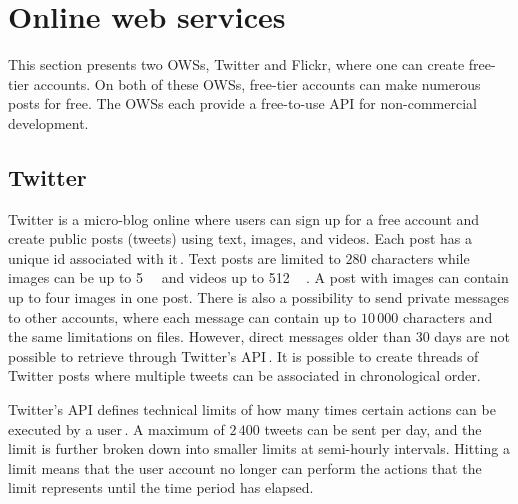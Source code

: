 \section{Online web services}
\label{sec:ows}
This section presents two \gls{OWS}s, Twitter and Flickr, where one can create \mbox{free-tier} accounts. On both of these \gls{OWS}s, \mbox{free-tier} accounts can make numerous posts for free. The \gls{OWS}s each provide a \mbox{free-to-use} \gls{API} for \mbox{non-commercial} development. 

\subsection{Twitter}
\label{subsec:ows_twitter}
Twitter is a \mbox{micro-blog} online where users can sign up for a free account and create public posts (tweets) using text, images, and videos. Each post has a unique id associated with it\,\cite{twitterTwitterIDs}. Text posts are limited to $280$ characters while images can be up to \SI{5}{\mega\byte} and videos up to \SI{512}{\mega\byte}\,\cite{MediaBestPractices}. A post with images can contain up to four images in one post. There is also a possibility to send private messages to other accounts, where each message can contain up to $10\,000$ characters and the same limitations on files. However, direct messages older than $30$ days are not possible to retrieve through Twitter's \gls{API}\,\cite{RetrievingOlder302018}. It is possible to create threads of Twitter posts where multiple tweets can be associated in chronological order.

Twitter's \gls{API} defines technical limits of how many times certain actions can be executed by a user\,\cite{UnderstandingTwitterLimits}. A maximum of $2\,400$ tweets can be sent per day, and the limit is further broken down into smaller limits at \mbox{semi-hourly} intervals. Hitting a limit means that the user account no longer can perform the actions that the limit represents until the time period has elapsed.

